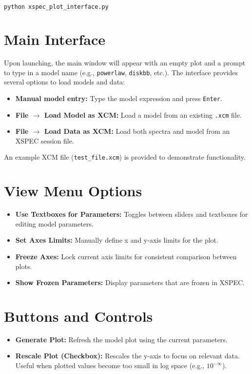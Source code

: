 \documentclass[11pt]{article}
\begin{document}
\begin{lstlisting}[language=bash]
python xspec_plot_interface.py
\end{lstlisting}

\section*{Main Interface}

Upon launching, the main window will appear with an empty plot and a prompt to type in a model name (e.g., \texttt{powerlaw}, \texttt{diskbb}, etc.). The interface provides several options to load models and data:

\begin{itemize}
    \item \textbf{Manual model entry:} Type the model expression and press \texttt{Enter}.
    \item \textbf{File $\rightarrow$ Load Model as XCM:} Load a model from an existing \texttt{.xcm} file.
    \item \textbf{File $\rightarrow$ Load Data as XCM:} Load both spectra and model from an XSPEC session file.
\end{itemize}

\noindent
An example XCM file (\texttt{test\_file.xcm}) is provided to demonstrate functionality.

\section*{View Menu Options}

\begin{itemize}
    \item \textbf{Use Textboxes for Parameters:} Toggles between sliders and textboxes for editing model parameters.
    \item \textbf{Set Axes Limits:} Manually define x and y-axis limits for the plot.
    \item \textbf{Freeze Axes:} Lock current axis limits for consistent comparison between plots.
    \item \textbf{Show Frozen Parameters:} Display parameters that are frozen in XSPEC.
\end{itemize}

\section*{Buttons and Controls}

\begin{itemize}
    \item \textbf{Generate Plot:} Refresh the model plot using the current parameters.
    \item \textbf{Rescale Plot (Checkbox):} Rescales the y-axis to focus on relevant data. Useful when plotted values become too small in log space (e.g., $10^{-\infty}$).
\end{itemize}
\end{document}
